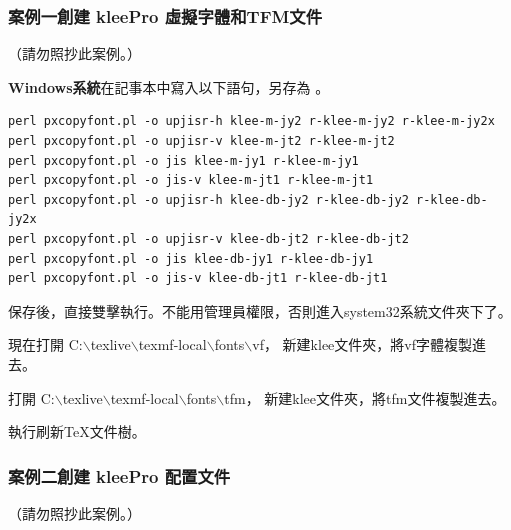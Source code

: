 \subsubsection*{案例一創建 {kleePro} 虛擬字體和TFM文件}

（請勿照抄此案例。）

\par{}{\bfseries{Windows系統}}在記事本中寫入以下語句，另存為 。
\begin{lstlisting}[firstnumber=1]
perl pxcopyfont.pl -o upjisr-h klee-m-jy2 r-klee-m-jy2 r-klee-m-jy2x
perl pxcopyfont.pl -o upjisr-v klee-m-jt2 r-klee-m-jt2
perl pxcopyfont.pl -o jis klee-m-jy1 r-klee-m-jy1
perl pxcopyfont.pl -o jis-v klee-m-jt1 r-klee-m-jt1
perl pxcopyfont.pl -o upjisr-h klee-db-jy2 r-klee-db-jy2 r-klee-db-jy2x
perl pxcopyfont.pl -o upjisr-v klee-db-jt2 r-klee-db-jt2
perl pxcopyfont.pl -o jis klee-db-jy1 r-klee-db-jy1
perl pxcopyfont.pl -o jis-v klee-db-jt1 r-klee-db-jt1
\end{lstlisting}

\par{}保存後，直接雙擊執行。不能用管理員權限，否則進入system32系統文件夾下了。
\par{}現在打開
{\color{red}C:$\backslash$texlive$\backslash$texmf-local$\backslash$fonts$\backslash$vf}，
新建klee文件夾，將vf字體複製進去。
\par{}打開
{\color{red}C:$\backslash$texlive$\backslash$texmf-local$\backslash$fonts$\backslash$tfm}，
新建klee文件夾，將tfm文件複製進去。
\par{}執行刷新{\TeX}文件樹。


\subsubsection*{案例二創建 {kleePro} 配置文件}

（請勿照抄此案例。）

